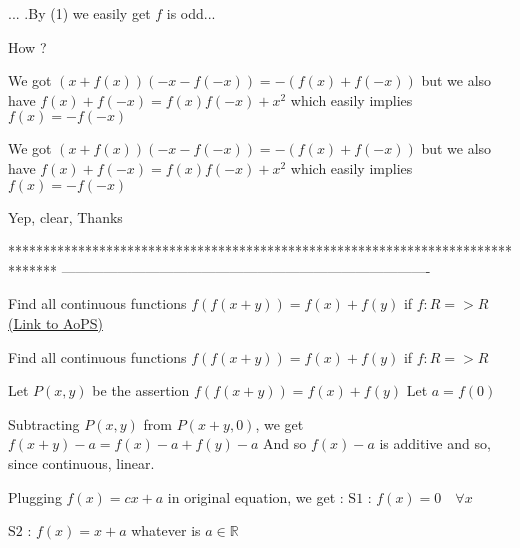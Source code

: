 \begin{solution}
	\begin{tcolorbox}... .By (1) we easily get $f $ is odd...\end{tcolorbox}
How ?

\end{solution}



\begin{solution}
	We got $(x+f (x))(-x-f (-x))=-(f (x)+f (-x)) $ but we also have  $f (x)+f (-x)=f (x)f (-x)+x^2$ which easily implies $f (x)=-f (-x) $
\end{solution}



\begin{solution}
	\begin{tcolorbox}We got $(x+f (x))(-x-f (-x))=-(f (x)+f (-x)) $ but we also have  $f (x)+f (-x)=f (x)f (-x)+x^2$ which easily implies $f (x)=-f (-x) $\end{tcolorbox}

Yep, clear,
Thanks

\end{solution}
*******************************************************************************
-------------------------------------------------------------------------------

\begin{problem}
	Find all continuous functions $ f (f (x+y))=f (x)+f (y)$
if $f:R =>R$
	\flushright \href{https://artofproblemsolving.com/community/c6h1606481}{(Link to AoPS)}
\end{problem}



\begin{solution}
	\begin{tcolorbox}Find all continuous functions $ f (f (x+y))=f (x)+f (y)$
if $f:R =>R$\end{tcolorbox}
Let $P(x,y)$ be the assertion $f(f(x+y))=f(x)+f(y)$
Let $a=f(0)$

Subtracting $P(x,y)$ from $P(x+y,0)$, we get $f(x+y)-a=f(x)-a+f(y)-a$
And so $f(x)-a$ is additive and so, since continuous, linear.

Plugging $f(x)=cx+a$ in original equation, we get :
$\boxed{\text{S1 : }f(x)=0\quad\forall x}$

$\boxed{\text{S2 : }f(x)=x+a}$ whatever is $a\in\mathbb R$


\end{solution}



